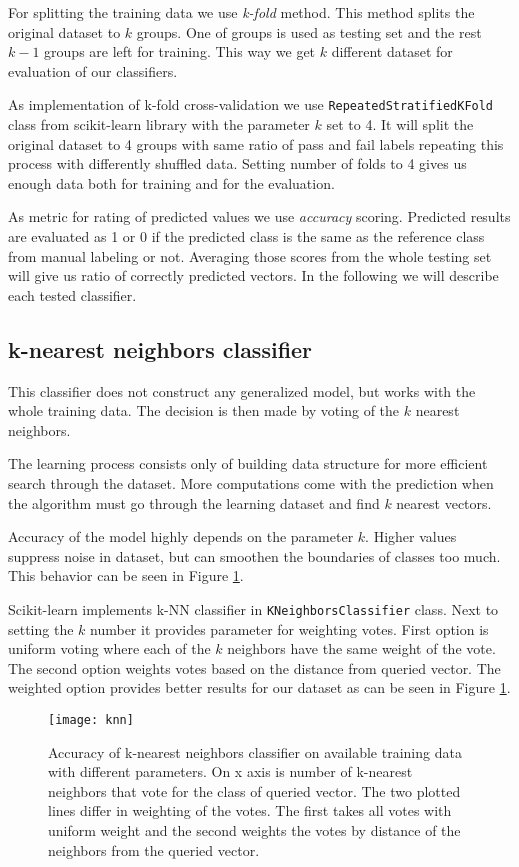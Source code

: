 For splitting the training data we use \emph{k-fold} method. This method
splits the original dataset to $k$ groups. One of groups is used as testing set and
the rest $k - 1$ groups are left for training. This way we get $k$ different
dataset for evaluation of our classifiers.

As implementation of k-fold cross-validation we use
\texttt{Repeated\-Stratified\-K\-Fold} class from scikit-learn library with the parameter
$k$ set to 4. It will split the original dataset to 4 groups with same ratio of
pass and fail labels repeating this process with differently shuffled data.
Setting number of folds to 4 gives us enough data both for training and for
the evaluation.

As metric for rating of predicted values we use \emph{accuracy} scoring.
Predicted results are evaluated as 1 or 0 if the predicted class is the same as the reference
class from manual labeling or not. Averaging those scores from the whole testing
set will give us ratio of correctly predicted vectors. In the following we will
describe each tested classifier.

\subsection{k-nearest neighbors classifier}
This classifier does not construct any generalized model, but works with the
whole training data. The decision is then made by voting of the $k$ nearest
neighbors.

The learning process consists only of building data structure for more efficient
search through the dataset. More computations come with the prediction
when the algorithm must go through the learning dataset and find $k$ nearest
vectors.

Accuracy of the model highly depends on the parameter $k$. Higher values
suppress noise in dataset, but can smoothen the boundaries of classes too much.
This behavior can be seen in Figure \ref{fig:knn}.

Scikit-learn implements k-NN classifier in \texttt{K\-Neighbors\-Classifier} class.
Next to setting the $k$ number it provides parameter for weighting votes. First
option is uniform voting where each of the $k$ neighbors have the same weight of
the vote. The second option weights votes based on the distance from queried
vector. The weighted option provides better results for our dataset as can be
seen in Figure \ref{fig:knn}.

\begin{figure}
  \centering
  \texttt{[image: knn]}
  \caption{Accuracy of k-nearest neighbors classifier on available training
    data with different parameters. On x axis is number of k-nearest neighbors
    that vote for the class of queried vector. The two plotted lines differ in
    weighting of the votes. The first takes all votes with uniform weight and
    the second weights the votes by distance of the neighbors from the queried
    vector.}
  \label{fig:knn}
\end{figure}

